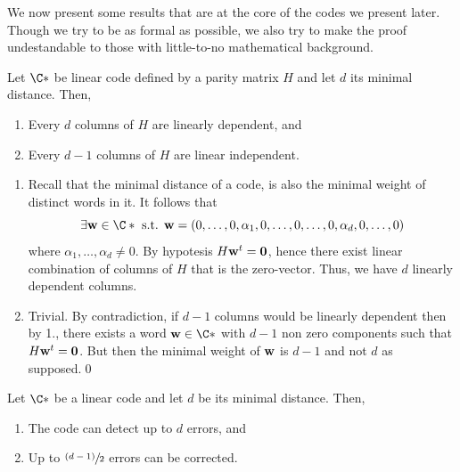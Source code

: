 \documentclass{subfiles}
\begin{document}
    We now present some results that are at the core of the codes we present later.
        Though we try to be as formal as possible, we also try to make the proof 
        undestandable to those with little-to-no mathematical background.

    \begin{theorem}\label{Thm:6.1}
        Let \(\C*\) be linear code defined by a parity matrix \(H\) and
            let \(d\) its minimal distance. Then, 
            \begin{enumerate}
                \item Every \(d\) columns of \(H\) are linearly dependent, and 
                \item Every \(d - 1\) columns of \(H\) are linear independent.
            \end{enumerate}
    \end{theorem}
    \begin{proof*}
        \begin{enumerate}
            \item Recall that the minimal distance of a code, is also the minimal weight
                of distinct words in it. It follows that 
                \[
                    \exists \bv{w} \in \C* \text{ s.t. } \bv{w} = 
                        (0, \ldots, 0, \alpha_{1}, 0, \ldots, 0, \ldots, 0, \alpha_{d}, 0, \ldots, 0)
                \]
                where \(\alpha_{1}, \ldots, \alpha_{d} \ne 0\). By hypotesis
                \(H \mathbf{w}^{t} = \mathbf{0}\), hence there exist linear combination 
                of columns of \(H\) that is the zero-vector. Thus, we have \(d\) linearly 
                dependent columns.

            \item Trivial. By contradiction, if \(d - 1\) columns would be linearly dependent 
                then by 1., there exists a word \(\bv{w} \in \C*\) with \(d - 1\) non 
                zero components such that \(H \mathbf{w}^{t} = \mathbf{0}\). 
                But then the minimal weight of \(\mathbf{w}\) is \(d - 1\) and not \(d\)
                as supposed.\qed
        \end{enumerate}
    \end{proof*}

    \begin{theorem}
        Let \(\C*\) be a linear code and let \(d\) be its minimal distance. Then,
            \begin{enumerate}
                \item The code can detect up to \(d\) errors, and 
                \item Up to \(\sfrac{(d - 1)}{2}\) errors can be corrected.
            \end{enumerate}
    \end{theorem}
\end{document}
